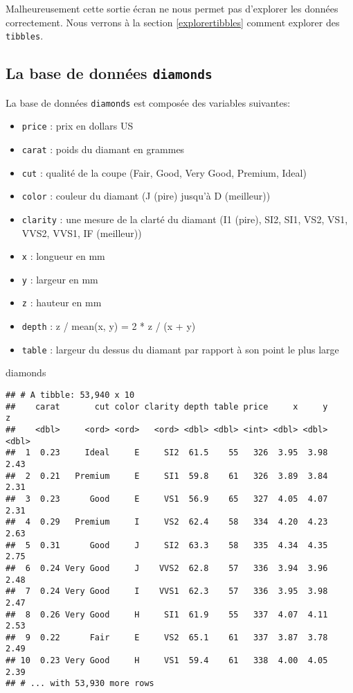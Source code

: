 \documentclass[]{book}
\newenvironment{Shaded}{\begin{snugshade}}{\end{snugshade}}
\newcommand{\NormalTok}[1]{#1}
\providecommand{\tightlist}{%
  \setlength{\itemsep}{0pt}\setlength{\parskip}{0pt}}
\begin{document}
Malheureusement cette sortie écran ne nous permet pas d'explorer les
données correctement. Nous verrons à la section \ref{explorertibbles}
comment explorer des \texttt{tibbles}.

\subsection{\texorpdfstring{La base de données
\texttt{diamonds}}{La base de données diamonds}}\label{donneesdiamonds}

La base de données \texttt{diamonds} est composée des variables
suivantes:

\begin{itemize}
\tightlist
\item
  \texttt{price} : prix en dollars US
\item
  \texttt{carat} : poids du diamant en grammes
\item
  \texttt{cut} : qualité de la coupe (Fair, Good, Very Good, Premium,
  Ideal)
\item
  \texttt{color} : couleur du diamant (J (pire) jusqu'à D (meilleur))
\item
  \texttt{clarity} : une mesure de la clarté du diamant (I1 (pire), SI2,
  SI1, VS2, VS1, VVS2, VVS1, IF (meilleur))
\item
  \texttt{x} : longueur en mm
\item
  \texttt{y} : largeur en mm
\item
  \texttt{z} : hauteur en mm
\item
  \texttt{depth} : z / mean(x, y) = 2 * z / (x + y)
\item
  \texttt{table} : largeur du dessus du diamant par rapport à son point
  le plus large
\end{itemize}

\begin{Shaded}
\begin{Highlighting}[]
\NormalTok{diamonds}
\end{Highlighting}
\end{Shaded}

\begin{verbatim}
## # A tibble: 53,940 x 10
##    carat       cut color clarity depth table price     x     y     z
##    <dbl>     <ord> <ord>   <ord> <dbl> <dbl> <int> <dbl> <dbl> <dbl>
##  1  0.23     Ideal     E     SI2  61.5    55   326  3.95  3.98  2.43
##  2  0.21   Premium     E     SI1  59.8    61   326  3.89  3.84  2.31
##  3  0.23      Good     E     VS1  56.9    65   327  4.05  4.07  2.31
##  4  0.29   Premium     I     VS2  62.4    58   334  4.20  4.23  2.63
##  5  0.31      Good     J     SI2  63.3    58   335  4.34  4.35  2.75
##  6  0.24 Very Good     J    VVS2  62.8    57   336  3.94  3.96  2.48
##  7  0.24 Very Good     I    VVS1  62.3    57   336  3.95  3.98  2.47
##  8  0.26 Very Good     H     SI1  61.9    55   337  4.07  4.11  2.53
##  9  0.22      Fair     E     VS2  65.1    61   337  3.87  3.78  2.49
## 10  0.23 Very Good     H     VS1  59.4    61   338  4.00  4.05  2.39
## # ... with 53,930 more rows
\end{verbatim}
\end{document}
